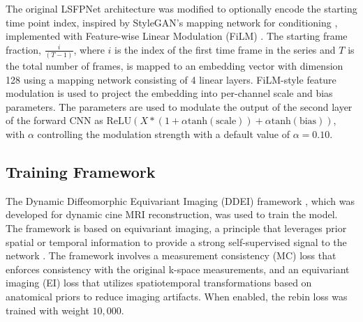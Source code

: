 \documentclass[runningheads]{llncs}
\begin{document}
The original LSFPNet architecture was modified to optionally encode the starting time point index, inspired by StyleGAN's mapping network for conditioning \cite{karras2019stylebasedgeneratorarchitecturegenerative}, implemented with Feature-wise Linear Modulation (FiLM) \cite{perez2017filmvisualreasoninggeneral}. The starting frame fraction, $\frac{i}{(T-1)}$, where $i$ is the index of the first time frame in the series and $T$ is the total number of frames, is mapped to an embedding vector with dimension 128 using a mapping network consisting of 4 linear layers. FiLM-style feature modulation is used to project the embedding into per-channel scale and bias parameters. The parameters are used to modulate the output of the second layer of the forward CNN as $\text{ReLU}(X * (1 + \alpha \text{tanh}(\text{scale})) + \alpha \text{tanh}(\text{bias}))$, with $\alpha$ controlling the modulation strength with a default value of $\alpha=0.10$.







\subsection{Training Framework}

The Dynamic Diffeomorphic Equivariant Imaging (DDEI) framework \cite{Wang_2025}, which was developed for dynamic cine MRI reconstruction, was used to train the model. The framework is based on equivariant imaging, a principle that leverages prior spatial or temporal information to provide a strong self-supervised signal to the network \cite{chen2021equivariantimaginglearningrange}. The framework involves a measurement consistency (MC) loss that enforces consistency with the original k-space measurements, and an equivariant imaging (EI) loss that utilizes spatiotemporal transformations based on anatomical priors to reduce imaging artifacts. When enabled, the rebin loss was trained with weight $10,000$.
\end{document}
